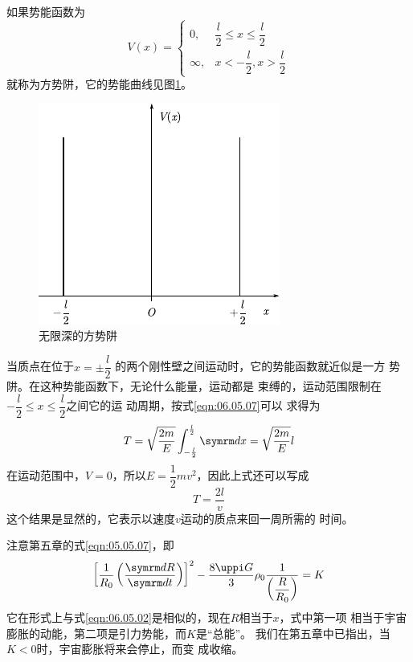 \example 如果势能函数为
\begin{equation*}
    V \left( x \right) = \begin{cases}
        0,&  \dfrac { l }{ 2 } \leqslant x \leqslant \dfrac { l } { 2 } \\
        \infty,&  x < - \dfrac { l } { 2 }, x > \dfrac { l } { 2 }
    \end{cases}
\end{equation*}
就称为方势阱，它的势能曲线见图\ref{fig:06.13}。

\begin{figure}
    \vspace{-1.56em}
    \centering
    \includegraphics{figure/fig06.13}
    \caption{无限深的方势阱}
    \label{fig:06.13}
\end{figure}
当质点在位于$ x = \pm \dfrac { l } { 2 } $
的两个刚性壁之间运动时，它的势能函数就近似是一方
势阱。在这种势能函数下，无论什么能量，运动都是
束缚的，运动范围限制在
$ - \dfrac { l } { 2 } \leqslant x \leqslant \dfrac { l } { 2 }   $之间它的运
动周期，按式\eqref{eqn:06.05.07}可以
求得为
\begin{equation*}
    T = \sqrt { \frac { 2 m } { E } } \int _ { - \frac { l } { 2 } } ^ { \frac { l } { 2 } } \dif x = \sqrt { \frac { 2 m } { E } } l
\end{equation*}
在运动范围中，$ V = 0   $，所以$ E = \dfrac { 1 } { 2 } m v ^ { 2 }   $，因此上式还可以写成
\begin{equation*}
    T = \frac { 2 l } { v }
\end{equation*}
这个结果是显然的，它表示以速度$ v $运动的质点来回一周所需的
时间。

\example 注意第五章的式\eqref{eqn:05.05.07}，即
\begin{equation}\label{eqn:06.05.08}
    \left[ \frac { 1 } { R _ { 0 } } \left( \frac { \dif R } { \dif t } \right) \right] ^ { 2 }- \frac { 8 \uppi G } { 3 } \rho _ 0 \frac { 1 } { \left( \dfrac { R } { R _ { 0 } } \right) } = K
\end{equation}
它在形式上与式\eqref{eqn:06.05.02}是相似的，现在$ R $相当于$ x $，式中第一项
相当于宇宙膨胀的动能，第二项是引力势能，而$ K $是“总能”。
我们在第五章中已指出，当$  K < 0   $时，宇宙膨胀将来会停止，而变
成收缩。

